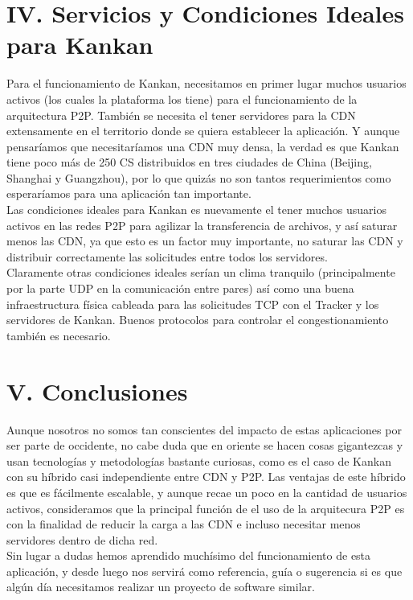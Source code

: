 \documentclass[12pt]{report}
\begin{document}
\section*{IV. Servicios y Condiciones Ideales para Kankan}

Para el funcionamiento de Kankan, necesitamos en primer lugar muchos usuarios activos (los cuales la plataforma los tiene) para el funcionamiento de la arquitectura P2P. También se necesita el tener servidores para la CDN extensamente en el territorio donde se quiera establecer la aplicación. Y aunque pensaríamos que necesitaríamos una CDN muy densa, la verdad es que Kankan tiene poco más de 250 CS distribuidos en tres ciudades de China (Beijing, Shanghai y Guangzhou), por lo que quizás no son tantos requerimientos como esperaríamos para una aplicación tan importante.\\
Las condiciones ideales para Kankan es nuevamente el tener muchos usuarios activos en las redes P2P para agilizar la transferencia de archivos, y así saturar menos las CDN, ya que esto es un factor muy importante, no saturar las CDN y distribuir correctamente las solicitudes entre todos los servidores.\\
Claramente otras condiciones ideales serían un clima tranquilo (principalmente por la parte UDP en la comunicación entre pares) así como una buena infraestructura física cableada para las solicitudes TCP con el Tracker y los servidores de Kankan. Buenos protocolos para controlar el congestionamiento también es necesario.\\

\section*{V. Conclusiones}

Aunque nosotros no somos tan conscientes del impacto de estas aplicaciones por ser parte de occidente, no cabe duda que en oriente se hacen cosas gigantezcas y usan tecnologías y metodologías bastante curiosas, como es el caso de Kankan con su híbrido casi independiente entre CDN y P2P. Las ventajas de este híbrido es que es fácilmente escalable, y aunque recae un poco en la cantidad de usuarios activos, consideramos que la principal función de el uso de la arquitecura P2P es con la finalidad de reducir la carga a las CDN e incluso necesitar menos servidores dentro de dicha red.\\
Sin lugar a dudas hemos aprendido muchísimo del funcionamiento de esta aplicación, y desde luego nos servirá como referencia, guía o sugerencia si es que algún día necesitamos realizar un proyecto de software similar.

\newpage

\nocite{*}


\end{document}

